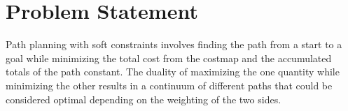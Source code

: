 \section{Problem Statement}

Path planning with soft constraints involves finding the path from a start to a goal while minimizing the total cost from the costmap and the accumulated totals of the path constant. The duality of maximizing the one quantity while minimizing the other results in a continuum of different paths that could be considered optimal depending on the weighting of the two sides. 






